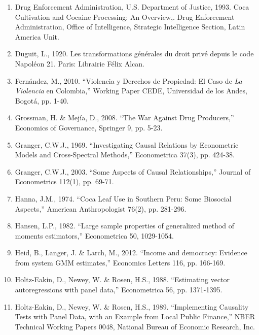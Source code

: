 \documentclass[12pt,a4paper,english]{article}%
\begin{document}
\begin{enumerate}
\item Drug Enforcement Administration, U.S. Department of Justice, 1993. Coca Cultivation and Cocaine Processing: An Overview,. Drug Enforcement Administration, Office of Intelligence, Strategic Intelligence Section, Latin America Unit.

\item Duguit, L., 1920. Les transformations g\'{e}n\'{e}rales du droit priv\'{e} depuis le code Napol\'{e}on 21. Paris: Librairie Félix Alcan.

\item Fern\'{a}ndez, M., 2010. ``Violencia y Derechos de Propiedad: El Caso de \emph{La Violencia} en Colombia,'' Working Paper CEDE, Universidad de los Andes, Bogot\'{a}, pp. 1-40.

\item Grossman, H. \& Mej\'{i}a, D., 2008. ``The War Against Drug Producers,'' Economics of Governance, Springer 9, pp. 5-23.

\item Granger, C.W.J., 1969. ``Investigating Causal Relations by Econometric Models and Cross-Spectral Methods,'' Econometrica 37(3), pp. 424-38.

\item Granger, C.W.J., 2003. ``Some Aspects of Causal Relationships,'' Journal of Econometrics 112(1), pp. 69-71.

\item Hanna, J.M., 1974. ``Coca Leaf Use in Southern Peru: Some Biosocial Aspects,'' American Anthropologist 76(2), pp. 281-296.

\item Hansen, L.P., 1982. ``Large sample properties of generalized method of moments estimators,'' Econometrica 50, 1029-1054.

\item Heid, B., Langer, J. \& Larch, M., 2012. ``Income and democracy: Evidence from system GMM estimates,'' Economics Letters 116, pp. 166-169.

\item Holtz-Eakin, D., Newey, W. \& Rosen, H.S., 1988. ``Estimating vector autoregressions with panel data,'' Econometrica 56, pp. 1371-1395.

\item Holtz-Eakin, D., Newey, W. \& Rosen, H.S., 1989.
``Implementing Causality Tests with Panel Data, with an Example from Local Public Finance,'' NBER Technical Working Papers 0048, National Bureau of Economic Research, Inc.


\end{enumerate}
\end{document}
